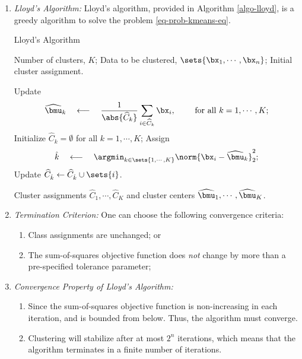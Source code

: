 \documentclass[12pt]{article}
\begin{document}
\begin{enumerate}[label=\textbf{\arabic*.}]
\begin{enumerate}
		\item \textit{Lloyd's Algorithm:} Lloyd's algorithm, provided in Algorithm \ref{algo-lloyd}, is a greedy algorithm to solve the problem \eqref{eq-prob-kmeans-eq}. 
		
		\begin{minipage}{\linewidth}
			\begin{algorithm}[H]
				\caption{Lloyd's Algorithm}\label{algo-lloyd}
				\begin{algorithmic}[1]
					\REQUIRE Number of clusters, $K$; 
					\REQUIRE Data to be clustered, $\sets{\bx_1, \cdots, \bx_n}$; 
					\REQUIRE Initial cluster assignment. 
					
					\REPEAT
					\STATE Update 
					\begin{align*}
						\widehat{\bmu}_k \quad \longleftarrow \quad \frac{1}{\abs{\widehat{C}_k}} \sum_{i \in \widehat{C}_k} \bx_i, \qquad \text{ for all } k = 1, \cdots, K; 
					\end{align*}
					\STATE Initialize $\widehat{C}_k = \emptyset$ for all $k = 1, \cdots, K$; 
					\STATE Assign 
					\begin{align*}
						\hat{k} \quad \longleftarrow \quad \argmin_{k \in \sets{1, \cdots, K}} \norm{\bx_i - \widehat{\bmu}_k}_2^2; 
					\end{align*}
					\STATE Update $\widehat{C}_{\hat{k}} \leftarrow \widehat{C}_{\hat{k}} \cup \sets{i}$. 
					\ENDFOR
					
					\RETURN Cluster assignments $\widehat{C}_1, \cdots, \widehat{C}_K$ and cluster centers ${\widehat{\bmu}_1, \cdots, \widehat{\bmu}_K}$. 
				\end{algorithmic} 
			\end{algorithm}
		\end{minipage}
		
		\vspace{10pt}
		
		\item \textit{Termination Criterion:} One can choose the following convergence criteria: 
		\begin{enumerate}
			\item Class assignments are unchanged; or 
			\item The sum-of-squares objective function does \emph{not} change by more than a pre-specified tolerance parameter; 
		\end{enumerate}
		
		\item \textit{Convergence Property of Lloyd's Algorithm:} 
		\begin{enumerate}
			\item Since the sum-of-squares objective function is non-increasing in each iteration, and is bounded from below. Thus, the algorithm must converge. 
			\item Clustering will stabilize after at most $2^n$ iterations, which means that the algorithm terminates in a finite number of iterations. 
		\end{enumerate}
		

\end{enumerate}
\end{enumerate}
\end{document}
